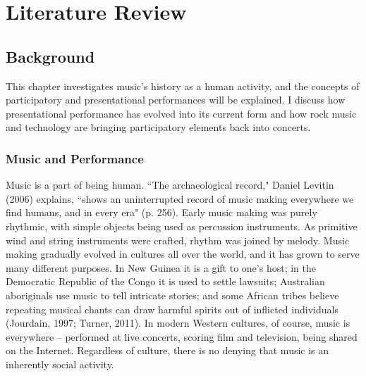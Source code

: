 \chapter{Literature Review}

\section{Background}

This chapter investigates music's history as a human activity, and the concepts of participatory and presentational performances will be explained. I discuss how presentational performance has evolved into its current form and how rock music and technology are bringing participatory elements back into concerts.

\subsection{Music and Performance}

Music is a part of being human. ``The archaeological record," Daniel Levitin (2006) explains, ``shows an uninterrupted record of music making everywhere we find humans, and in every era" (p. 256). Early music making was purely rhythmic, with simple objects being used as percussion instruments. As primitive wind and string instruments were crafted, rhythm was joined by melody. Music making gradually evolved in cultures all over the world, and it has grown to serve many different purposes. In New Guinea it is a gift to one's host; in the Democratic Republic of the Congo it is used to settle lawsuits; Australian aboriginals use music to tell intricate stories; and some African tribes believe repeating musical chants can draw harmful spirits out of inflicted individuals (Jourdain, 1997; Turner, 2011). In modern Western cultures, of course, music is everywhere -- performed at live concerts, scoring film and television, being shared on the Internet. Regardless of culture, there is no denying that music is an inherently social activity.

